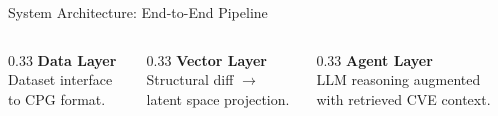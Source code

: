 \documentclass[aspectratio=169,10pt]{beamer}
\begin{document}
\begin{frame}{System Architecture: End-to-End Pipeline}
\vfill
\begin{columns}[t]
  \begin{column}{0.33\textwidth}\centering
    \textbf{\textcolor{c1}{Data Layer}}\\
    \scriptsize Dataset interface to CPG format.
  \end{column}
  \begin{column}{0.33\textwidth}\centering
    \textbf{\textcolor{c3}{Vector Layer}}\\
    \scriptsize Structural diff $\rightarrow$ latent space projection.
  \end{column}
  \begin{column}{0.33\textwidth}\centering
    \textbf{\textcolor{c5}{Agent Layer}}\\
    \scriptsize LLM reasoning augmented with retrieved CVE context.
  \end{column}
\end{columns}
\end{frame}



\end{document}
